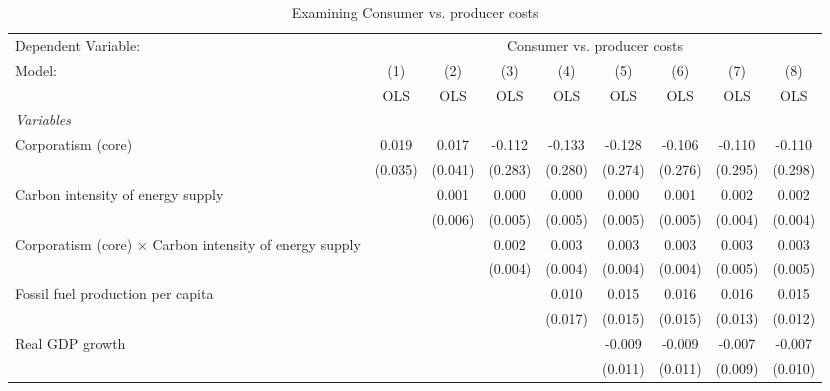 
\begin{table}[htbp]
   \caption{Examining Consumer vs. producer costs}
   \centering
   \begin{tabular}{lcccccccc}
      \toprule
      Dependent Variable: & \multicolumn{8}{c}{Consumer vs. producer costs}\\
      Model:                                                         & (1)     & (2)     & (3)     & (4)     & (5)     & (6)     & (7)     & (8)\\  
                                                                     &  OLS    & OLS     & OLS     & OLS     & OLS     & OLS     & OLS     & OLS\\  
      \midrule
      \emph{Variables}\\
      Corporatism (core)                                             & 0.019   & 0.017   & -0.112  & -0.133  & -0.128  & -0.106  & -0.110  & -0.110\\   
                                                                     & (0.035) & (0.041) & (0.283) & (0.280) & (0.274) & (0.276) & (0.295) & (0.298)\\   
      Carbon intensity of energy supply                              &         & 0.001   & 0.000   & 0.000   & 0.000   & 0.001   & 0.002   & 0.002\\   
                                                                     &         & (0.006) & (0.005) & (0.005) & (0.005) & (0.005) & (0.004) & (0.004)\\   
      Corporatism (core) $\times$ Carbon intensity of energy supply  &         &         & 0.002   & 0.003   & 0.003   & 0.003   & 0.003   & 0.003\\   
                                                                     &         &         & (0.004) & (0.004) & (0.004) & (0.004) & (0.005) & (0.005)\\   
      Fossil fuel production per capita                              &         &         &         & 0.010   & 0.015   & 0.016   & 0.016   & 0.015\\   
                                                                     &         &         &         & (0.017) & (0.015) & (0.015) & (0.013) & (0.012)\\   
      Real GDP growth                                                &         &         &         &         & -0.009  & -0.009  & -0.007  & -0.007\\   
                                                                     &         &         &         &         & (0.011) & (0.011) & (0.009) & (0.010)\\   

\end{tabular}
\end{table}
